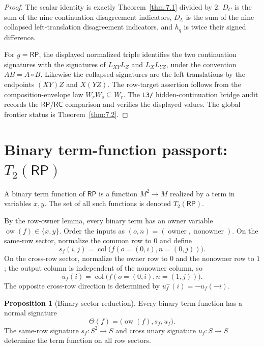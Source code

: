 \documentclass[11pt]{article}
\theoremstyle{definition}
\newtheorem{proposition}[theorem]{Proposition}
\newcommand{\RP}{\mathsf{RP}}
\newcommand{\RC}{\mathsf{RC}}
\begin{document}
\begin{proof}
The scalar identity is exactly Theorem~\ref{thm:7.1} divided by \(2\):
\(D_C\) is the sum of the nine continuation disagreement indicators,
\(D_L\) is the sum of the nine collapsed left-translation disagreement
indicators, and \(h_q\) is twice their signed difference.

For \(g=\RP\), the displayed normalized triple identifies the two
continuation signatures with the signatures of \(L_{XY}L_Z\) and
\(L_XL_{YZ}\), under the convention \(AB=A\circ B\).  Likewise the
collapsed signatures are the left translations by the endpoints
\((XY)Z\) and \(X(YZ)\).  The row-target assertion follows from the
composition-envelope law \(W_rW_s\subseteq W_r\).  The \texttt{L3/} hidden-continuation bridge audit records the
\(\RP\)/\(\RC\) comparison and verifies the displayed values.  The global frontier status
is Theorem~\ref{thm:7.2}.
\end{proof}

\section{\texorpdfstring{Binary term-function passport: \(T_2(\RP)\)}{Binary term-function passport: T2(RP)}}\label{binary-term-algebra}

A binary term function of \(\RP\) is a function \(M^2\to M\) realized by a
term in variables \(x,y\).  The set of all such functions is denoted
\(T_2(\RP)\).

By the row-owner lemma, every binary term has an owner variable
\(\operatorname{ow}(f)\in\{x,y\}\).  Order the inputs as
\((o,n)=(\operatorname{owner},\operatorname{nonowner})\).  On the same-row
sector, normalize the common row to \(0\) and define
\[
s_f(i,j)=\operatorname{col}\bigl(f(o=(0,i),n=(0,j))\bigr).
\]
On the cross-row sector, normalize the owner row to \(0\) and the nonowner
row to \(1\); the output column is independent of the nonowner column, so
\[
u_f(i)=\operatorname{col}\bigl(f(o=(0,i),n=(1,j))\bigr).
\]
The opposite cross-row direction is determined by \(u_f^{-}(i)=-u_f(-i)\).

\begin{proposition}[Binary sector reduction]
\label{prop:18.1}
Every binary term function has a normal signature
\[
\Theta(f)=\bigl(\operatorname{ow}(f),s_f,u_f\bigr).
\]
The same-row signature \(s_f:S^2\to S\) and cross unary signature
\(u_f:S\to S\) determine the term function on all row sectors.
\end{proposition}
\end{document}
